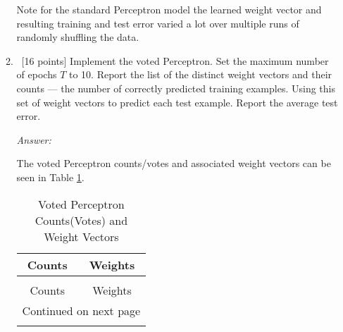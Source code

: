 \documentclass[12pt, fullpage,letterpaper]{article}
\begin{document}
\begin{enumerate}
\begin{enumerate}
	Note for the standard Perceptron model the learned weight vector and resulting training and test error varied a lot over multiple runs of randomly shuffling the data.


	\item~[16 points] Implement the voted Perceptron. Set the maximum number of epochs $T$ to 10. Report the list of the distinct weight vectors and their counts --- the number of correctly predicted training examples. Using this set of weight vectors to predict each test example. Report the average test error. 

	\textit{Answer:}

	The voted Perceptron counts/votes and associated weight vectors can be seen in Table \ref{tab:2b}.

	{\tiny
	\begin{longtable}{|c|c|}
		\caption{Voted Perceptron Counts(Votes) and Weight Vectors}
		\label{tab:2b}\\
		\toprule
		 Counts &                            Weights \\
		\midrule
		\endfirsthead
		\caption[]{Voted Perceptron Counts(Votes) and Weight Vectors} \\
		\toprule
		 Counts &                            Weights \\
		\midrule
		\endhead
		\midrule
		\multicolumn{2}{r}{{Continued on next page}} \\
		\midrule
		\endfoot
		

\end{longtable}}
\end{enumerate}
\end{enumerate}
\end{document}

